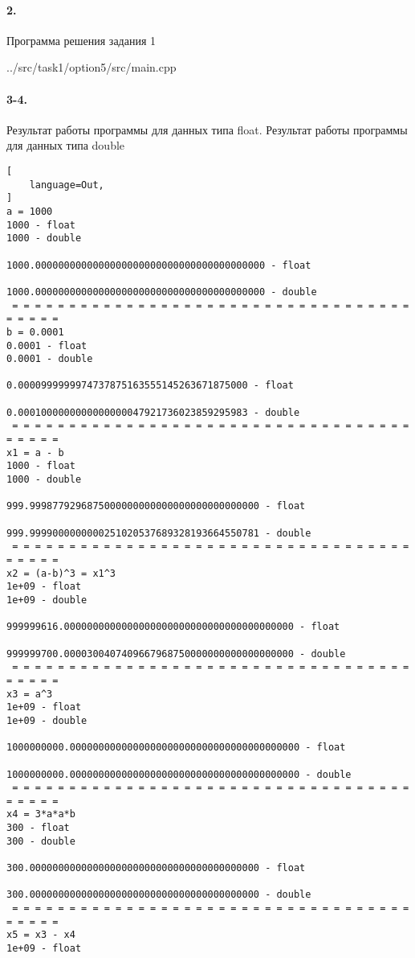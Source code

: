 \paragraph{2.} Программа решения задания 1


{../src/task1/option5/src/main.cpp}

\paragraph{3-4.} Результат работы программы для данных типа float. Результат работы программы для данных типа double

\begin{lstlisting}[
    language=Out,
]
a = 1000
1000 - float
1000 - double
                                   1000.0000000000000000000000000000000000000000 - float
                                   1000.0000000000000000000000000000000000000000 - double
 = = = = = = = = = = = = = = = = = = = = = = = = = = = = = = = = = = = = = = = =
b = 0.0001
0.0001 - float
0.0001 - double
                                      0.0000999999974737875163555145263671875000 - float
                                      0.0001000000000000000047921736023859295983 - double
 = = = = = = = = = = = = = = = = = = = = = = = = = = = = = = = = = = = = = = = =
x1 = a - b
1000 - float
1000 - double
                                    999.9998779296875000000000000000000000000000 - float
                                    999.9999000000000251020537689328193664550781 - double
 = = = = = = = = = = = = = = = = = = = = = = = = = = = = = = = = = = = = = = = =
x2 = (a-b)^3 = x1^3
1e+09 - float
1e+09 - double
                              999999616.0000000000000000000000000000000000000000 - float
                              999999700.0000300407409667968750000000000000000000 - double
 = = = = = = = = = = = = = = = = = = = = = = = = = = = = = = = = = = = = = = = =
x3 = a^3
1e+09 - float
1e+09 - double
                             1000000000.0000000000000000000000000000000000000000 - float
                             1000000000.0000000000000000000000000000000000000000 - double
 = = = = = = = = = = = = = = = = = = = = = = = = = = = = = = = = = = = = = = = =
x4 = 3*a*a*b
300 - float
300 - double
                                    300.0000000000000000000000000000000000000000 - float
                                    300.0000000000000000000000000000000000000000 - double
 = = = = = = = = = = = = = = = = = = = = = = = = = = = = = = = = = = = = = = = =
x5 = x3 - x4
1e+09 - float

\end{lstlisting}
